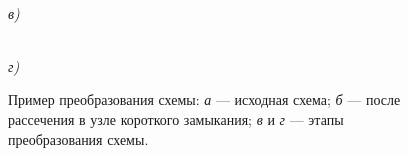 \begin{figure}[]
\begin{minipage}[h]{0.47\linewidth}
		 \\ \textit{в)}
	\end{minipage}
	\hfill
	\begin{minipage}[h]{0.47\linewidth}
		 \\ \textit{г)}
	\end{minipage}
	\caption{Пример преобразования схемы: \textit{а} --- исходная схема; \textit{б} --- после рассечения в узле короткого замыкания; \textit{в} и \textit{г} --- этапы преобразования схемы.}
	\label{ris:2-4 primer_preobrazovaniia_skhemy}
\end{figure}

